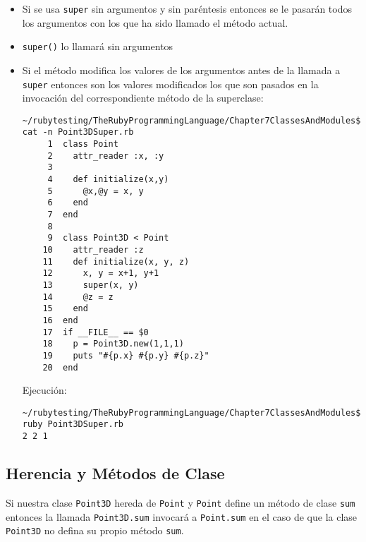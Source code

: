 \begin{itemize}
\item
Si se usa \verb|super| sin argumentos y sin paréntesis
entonces se le pasarán todos los argumentos con los que ha sido llamado el método
actual.
\item \verb|super()| lo llamará sin argumentos
\item Si el método modifica los valores de los argumentos antes de la llamada a \verb|super|
entonces son los valores modificados los que son pasados en la invocación del correspondiente 
método de la superclase:
\begin{verbatim}
~/rubytesting/TheRubyProgrammingLanguage/Chapter7ClassesAndModules$ cat -n Point3DSuper.rb 
     1  class Point
     2    attr_reader :x, :y   
     3  
     4    def initialize(x,y)
     5      @x,@y = x, y
     6    end
     7  end
     8  
     9  class Point3D < Point
    10    attr_reader :z
    11    def initialize(x, y, z)
    12      x, y = x+1, y+1
    13      super(x, y)
    14      @z = z
    15    end
    16  end
    17  if __FILE__ == $0
    18    p = Point3D.new(1,1,1)
    19    puts "#{p.x} #{p.y} #{p.z}"
    20  end
\end{verbatim}

Ejecución:
\begin{verbatim}
~/rubytesting/TheRubyProgrammingLanguage/Chapter7ClassesAndModules$ ruby Point3DSuper.rb 
2 2 1
\end{verbatim}
\end{itemize}


\subsection{Herencia y Métodos de Clase}

Si nuestra clase \verb|Point3D| hereda de \verb|Point| y 
\verb|Point| define un método de clase \verb|sum|
entonces la llamada \verb|Point3D.sum| invocará a \verb|Point.sum| 
en el caso de que la clase \verb|Point3D| no defina su propio método \verb|sum|.

